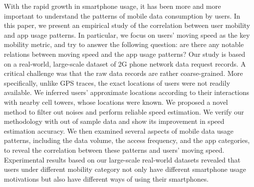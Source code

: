 With the rapid growth in smartphone usage, it has been more and more important to understand the patterns of mobile data consumption by users.
In this paper, we present an empirical study 
of the correlation between user mobility and app usage patterns.
In particular, we focus on users' moving speed as the key mobility metric,
and try to answer the following question:
are there any notable relations between moving speed and the app usage patterns?
Our study is based on a real-world, large-scale dataset of 2G phone network data request records.
A critical challenge was that the raw data records are rather coarse-grained.
More specifically, unlike GPS traces, the exact locations of users were not readily available.
We inferred users' approximate locations according to their interactions with nearby cell towers, whose locations were known.
We %
proposed a novel method to filter out noises and perform reliable speed estimation.
We verify our methodology with out of sample data and show its improvement in speed estimation accuracy.
We then examined several aspects of mobile data usage patterns,
including the data volume, the access frequency, and the app categories,
to reveal the correlation between these patterns and users' moving speed.
Experimental results based on our large-scale real-world datasets revealed that users under different mobility category not only have different smartphone usage motivations but also have different ways of using their smartphones.